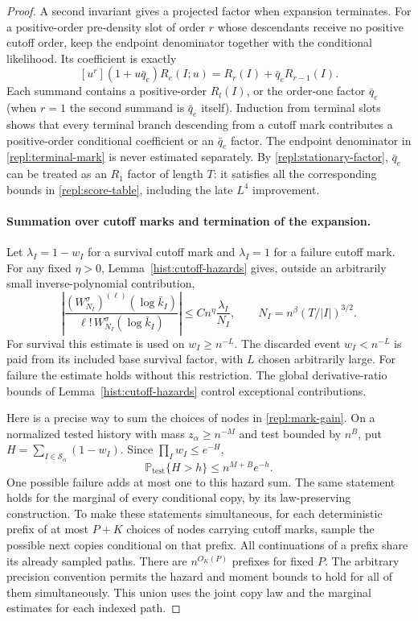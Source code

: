 \begin{proof}
A second invariant gives a projected factor when expansion terminates.
For a positive-order pre-density slot of order $r$ whose descendants receive
no positive cutoff order, keep the endpoint denominator together with the
conditional likelihood.  Its coefficient is exactly
\begin{equation}\label{repl:terminal-mark}
 [u^r](1+u \bar q_e)R_e(I;u)
       =R_r(I)+\bar q_e R_{r-1}(I).
\end{equation}
Each summand contains a positive-order $R_l(I)$, or the order-one factor
$\bar q_e$ (when $r=1$ the second summand is $\bar q_e$ itself).
Induction from terminal slots shows that every terminal branch descending
from a cutoff mark contributes a positive-order conditional coefficient or an
$\bar q_e$ factor.  The endpoint denominator in
\eqref{repl:terminal-mark} is never estimated separately.  By
\eqref{repl:stationary-factor}, $\bar q_e$ can be treated as an $R_1$ factor
of length $T$: it satisfies all the corresponding bounds in
\eqref{repl:score-table}, including the late $L^4$ improvement.

\paragraph{Summation over cutoff marks and termination of the expansion.}
Let $\lambda_I=1-w_I$ for a survival cutoff mark and $\lambda_I=1$ for a
failure cutoff mark.  For any fixed $\eta>0$,
Lemma~\ref{hist:cutoff-hazards} gives, outside an arbitrarily small
inverse-polynomial contribution,
\begin{equation}\label{repl:mark-gain}
 \left|
 \frac{(W_{N_I}^{\sigma})^{(\ell)}(\log\bar k_I)}
      {\ell!\,W_{N_I}^{\sigma}(\log\bar k_I)}
 \right|
 \le C n^\eta\frac{\lambda_I}{N_I},
 \qquad
 N_I=n^\beta(T/|I|)^{3/2}.
\end{equation}
For survival this estimate is used on $w_I\ge n^{-L}$.
The discarded event $w_I<n^{-L}$ is paid from its included base survival
factor, with $L$ chosen arbitrarily large.  For failure the estimate holds
without this restriction.  The global derivative-ratio bounds of
Lemma~\ref{hist:cutoff-hazards} control exceptional contributions.

Here is a precise way to sum the choices of nodes in
\eqref{repl:mark-gain}.  On a normalized tested history with mass
$z_\alpha\ge n^{-M}$ and test bounded by $n^B$, put
$H=\sum_{I\in\mathscr S_\alpha}(1-w_I)$.  Since
$\prod_I w_I\le e^{-H}$,
\[
 \mathbb P_{\mathrm{test}}\{H>h\}\le n^{M+B}e^{-h}.
\]
One possible failure adds at most one to this hazard sum.  The same
statement holds for the marginal of every conditional copy, by its
law-preserving construction.  To make these statements simultaneous, for
each deterministic prefix of at most $P+K$ choices of nodes carrying cutoff
marks, sample the possible next copies conditional on that prefix.  All continuations
of a prefix share its already sampled paths.  There are $n^{O_K(P)}$
prefixes for fixed $P$.  The arbitrary precision convention permits the
hazard and moment bounds to hold for all of them simultaneously.  This union
uses the joint copy law and the marginal estimates for each indexed path.


\end{proof}
